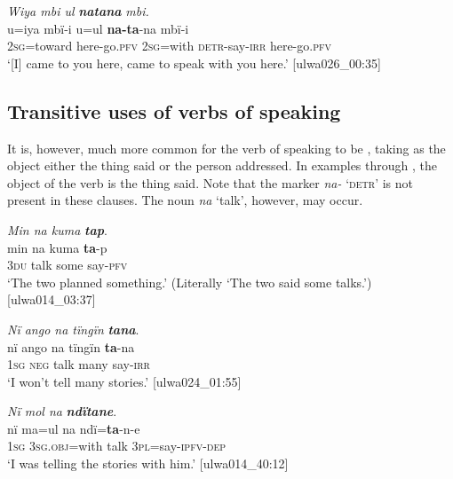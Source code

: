 \ea%
    \label{ex:syntax:182}
          \textit{Wiya mbi ul} \textbf{\textit{natana}} \textit{mbi.}\\
\gll    u=iya      mbï-i      u=ul    \textbf{na-ta}{}-na    mbï-i\\
    2\textsc{sg=}toward  here-go.\textsc{pfv}  2\textsc{sg}=with  \textsc{detr-}say-\textsc{irr}  here-go.\textsc{pfv}\\
\glt `[I] came to you here, came to speak with you here.’ [ulwa026\_00:35]
\z

\subsection{Transitive uses of verbs of speaking}\label{sec:13.4.2}


It is, however, much more common for the verb of speaking to be , taking as the object either the thing said or the person addressed. In examples  through , the object of the verb is the thing said. Note that the  marker \textit{na-} \textsc{‘detr’} is not present in these  clauses. The noun \textit{na} ‘talk’, however, may occur.

\ea%
    \label{ex:syntax:183}
          \textit{Min na kuma} \textbf{\textit{tap}}.\\
\gll min  na    kuma  \textbf{ta}{}-p\\
    3\textsc{du}  talk  some  say-\textsc{pfv}\\
\glt `The two planned something.’ (Literally ‘The two said some talks.’) [ulwa014\_03:37]
\z

\ea%
    \label{ex:syntax:184}
          \textit{Nï ango na tïngïn} \textbf{\textit{tana}}.\\
\gll nï    ango  na    tïngïn  \textbf{ta}{}-na\\
    1\textsc{sg}  \textsc{neg}  talk  many  say-\textsc{irr}\\
\glt `I won’t tell many stories.’ [ulwa024\_01:55]
\z

\ea%
    \label{ex:syntax:185}
          \textit{Nï mol na} \textbf{\textit{ndïtane}}.\\
\gll nï    ma=ul      na    ndï=\textbf{ta}{}-n-e\\
    1\textsc{sg}  3\textsc{sg.obj}=with  talk  3\textsc{pl}=say-\textsc{ipfv-dep}\\
\glt `I was telling the stories with him.’ [ulwa014\_40:12]
\z

